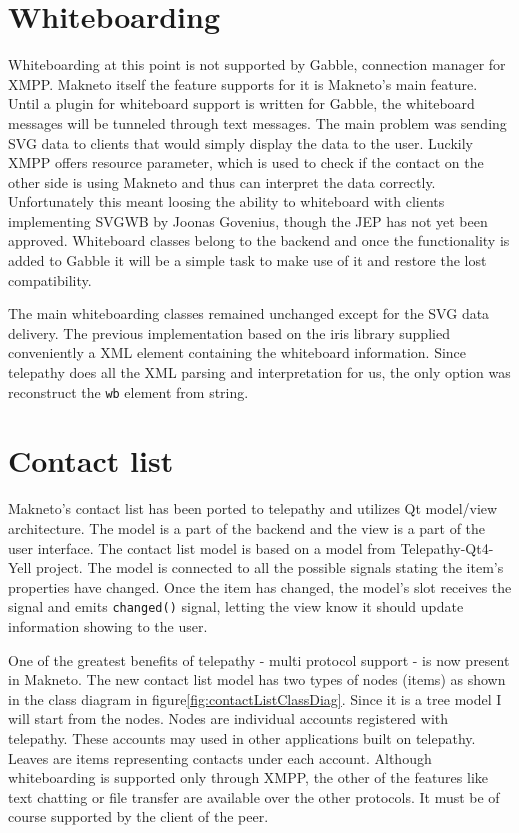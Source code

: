 \section{Whiteboarding}
Whiteboarding at this point is not supported by Gabble, connection manager for XMPP. Makneto itself the feature supports for it is Makneto's main feature. Until a plugin for whiteboard support is written for Gabble, the whiteboard messages will be tunneled through text messages. The main problem was sending SVG data to clients that would simply display the data to the user. Luckily XMPP offers resource parameter, which is used to check if the contact on the other side is using Makneto and thus can interpret the data correctly. Unfortunately this meant loosing the ability to whiteboard with clients implementing SVGWB by Joonas Govenius, though the JEP has not yet been approved. Whiteboard classes belong to the backend and once the functionality is added to Gabble it will be a simple task to make use of it and restore the lost compatibility. 

The main whiteboarding classes remained unchanged except for the SVG data delivery. The previous implementation based on the iris library supplied conveniently a XML element containing the whiteboard information. Since telepathy does all the XML parsing and interpretation for us, the only option was reconstruct the \verb|wb| element from string.  

\section{Contact list}\label{section:contactList}
Makneto's contact list has been ported to telepathy and utilizes Qt model/view architecture. The model is a part of the backend and the view is a part of the user interface. The contact list model is based on a model from Telepathy-Qt4-Yell project\cite{telepathy-qt4-yell}. The model is connected to all the possible signals stating the item's properties have changed. Once the item has changed, the model's slot receives the signal and emits \verb|changed()| signal, letting the view know it should update information showing to the user.   

One of the greatest benefits of telepathy - multi protocol support - is now present in Makneto. The new contact list model has two types of nodes (items) as shown in the class diagram in figure\ref{fig:contactListClassDiag}. Since it is a tree model I will start from the nodes. Nodes are individual accounts registered with telepathy. These accounts may used in other applications built on telepathy. Leaves are items representing contacts under each account. Although whiteboarding is supported only through XMPP, the other of the features like text chatting or file transfer are available over the other protocols. It must be of course supported by the client of the peer.

